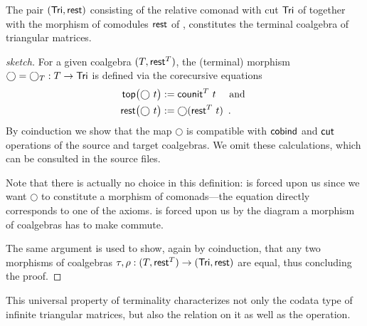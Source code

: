 \documentclass[envcountsame]{llncs}
\begin{document}
\begin{theorem}\label{ex:final_sem_tri} 
   The pair $(\mathsf{Tri}, \mathsf{rest})$ consisting of the relative comonad with cut $\mathsf{Tri}$ of  together with 
    the morphism of comodules $\mathsf{rest}$ of ,
   constitutes the terminal coalgebra of triangular matrices.
\end{theorem}

\begin{Long}
\begin{proof}[sketch]
   For a given coalgebra $(T,\mathsf{rest}^T)$, the (terminal) morphism $\bigcirc = \bigcirc_T:T\to\mathsf{Tri}$ is defined via the corecursive equations
    \begin{align}\mathsf{top}\bigl(\bigcirc~t\bigr) &:= \mathsf{counit}^T~t \quad\text{ and } \label{eq:terminal_top}\\
                     \mathsf{rest}\bigl(\bigcirc~t\bigr) &:= \bigcirc(\mathsf{rest}^T~t) \enspace . \label{eq:terminal_rest}
      \end{align}
      By coinduction we show that the map $\bigcirc$ is compatible with $\mathsf{cobind}$ and $\mathsf{cut}$ operations of the source and 
   target coalgebras. We omit these calculations, which can be consulted in the \coq source files.
   
   Note that there is actually no choice in this definition:  is forced upon us since we want $\bigcirc$ to constitute 
   a morphism of comonads---the equation directly corresponds to one of the axioms.
    is forced upon us by the diagram a morphism of coalgebras has to make commute.
   
   The same argument is used to show, again by coinduction, that any two morphisms of coalgebras $\tau,\rho : (T,\mathsf{rest}^T) \to (\mathsf{Tri},\mathsf{rest})$
   are equal, thus concluding the proof.   
\end{proof}
\end{Long}

This universal property of terminality characterizes not only the codata type of infinite triangular matrices, but also
the  relation on it as well as the  operation.
\end{document}
